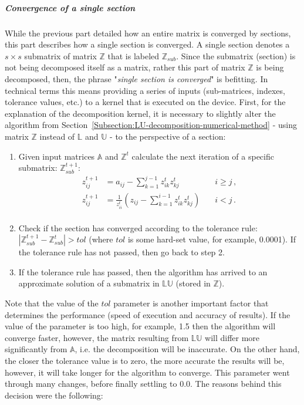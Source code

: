 \subparagraph{Convergence of a single section}\label{Subparagraph:implementation-decomposition-project-lu-decomposition-iterative-crout-method-convergence-of-single-section}
While the previous part detailed how an entire matrix is converged by sections, this part describes how a single section is converged. A single section denotes a $ s\times s $ submatrix of matrix $ \mathbb{Z} $ that is labeled $ \mathbb{Z}_{sub} $. Since the submatrix (section) is not being decomposed itself as a matrix, rather this part of matrix $ \mathbb{Z} $ is being decomposed, then, the phrase "\textit{single section is converged}" is befitting. In technical terms this means providing a series of inputs (sub-matrices, indexes, tolerance values, etc.) to a kernel that is executed on the device. First, for the explanation of the decomposition kernel, it is necessary to slightly alter the algorithm from Section~\ref{Subsection:LU-decomposition-numerical-method} - using matrix $ \mathbb{Z} $ instead of $ \mathbb{L} $ and $ \mathbb{U} $ - to the perspective of a section:

\begin{enumerate}
	\item Given input matrices $ \mathbb{A} $ and $ \mathbb{Z}^t $ calculate the next iteration of a specific submatrix: $ \mathbb{Z}^{t+1}_{sub} $:
		\begin{align}
			z_{ij}^{t+1} &= a_{ij} - \sum_{k=1}^{j-1}z_{ik}^{t}z_{kj}^{t}                                                              &\quad i \geq j \nonumber\,, \\
			z_{ij}^{t+1} &= \frac{1}{z_{ii}^{t}} \left ( z_{ij} - \sum_{k=1}^{i-1}z_{ik}^{t}z_{kj}^{t} \right ) &\quad i < j \nonumber\,.\\
		\end{align}
	\item Check if the section has converged according to the tolerance rule: $ \left | \mathbb{Z}^{t+1}_{sub} - \mathbb{Z}^{t}_{sub} \right | > tol $ (where $ tol $ is some hard-set value, for example, 0.0001). If the tolerance rule has not passed, then go back to step 2.
	\item If the tolerance rule has passed, then the algorithm has arrived to an approximate solution of a submatrix in $ \mathbb{L}\mathbb{U} $ (stored in $ \mathbb{Z} $).
\end{enumerate}

Note that the value of the $ tol $ parameter is another important factor that determines the performance (speed of execution and accuracy of results). If the value of the parameter is too high, for example, 1.5 then the algorithm will converge faster, however, the matrix resulting from $ \mathbb{L}\mathbb{U} $ will differ more significantly from $ \mathbb{A} $, i.e. the decomposition will be inaccurate. On the other hand, the closer the tolerance value is to zero, the more accurate the results will be, however, it will take longer for the algorithm to converge. This parameter went through many changes, before finally settling to 0.0. The reasons behind this decision were the following:

